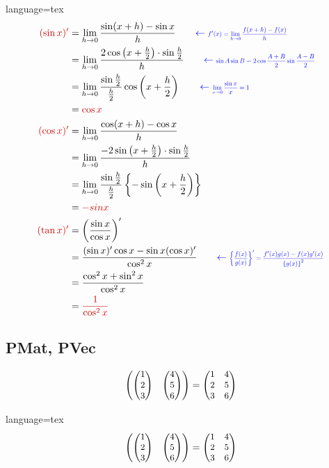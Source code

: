 \documentclass[../main]{subfiles}
\begin{document}
\begin{Code}{language=tex}
    \begin{align}
        \EmLight{(\sin x)'} &= \lim_{h\to 0}\frac{\sin(x+h)-\sin x}{h}
        \qquad \ExprNote{f'(x) = \lim_{h\to 0}\frac{f(x+h)-f(x)}{h}} \\
        &= \lim_{h\to 0}\frac{2\cos\left(x+\frac{h}{2}\right)\cdot\sin\frac{h}{2}}{h}
        \qquad \ExprNote{\sin A\sin B = 2\cos\frac{A+B}{2}\sin\frac{A-B}{2}} \\
        &= \lim_{h\to 0}\frac{\sin\frac{h}{2}}{\frac{h}{2}}\cos\left(x+\frac{h}{2}\right)
        \qquad \ExprNote{\lim_{x\to 0}\frac{\sin x}{x} = 1} \\
        &= \EmLight{\cos x} \\
        \EmLight{(\cos x)'} &= \lim_{h\to 0}\frac{\cos(x+h)-\cos x}{h} \\
        &= \lim_{h\to 0}\frac{-2\sin\left(x+\frac{h}{2}\right)\cdot\sin\frac{h}{2}}{h} \\
        &= \lim_{h\to 0}\frac{\sin\frac{h}{2}}{\frac{h}{2}}
        \left\{-\sin\left(x+\frac{h}{2}\right)\right\} \\
        &= \EmLight{-sin x} \\
        \EmLight{(\tan x)'} &= \left(\frac{\sin x}{\cos x}\right)' \\
        &= \frac{(\sin x)'\cos x - \sin x(\cos x)'}{\cos^2 x}
        \qquad \ExprNote{
            \left\{
                \frac{f(x)}{g(x)}
            \right\}' = \frac{f'(x)g(x)-f(x)g'(x)}
            {\left\{g(x)\right\}^2}
        } \\
        &= \frac{\cos^2 x + \sin^2 x}{\cos^2 x} \\
        &= \EmLight{\frac{1}{\cos^2 x}}
    \end{align}
\end{Code}

\subsection{PMat, PVec}

\[
    \PMat{\PVec{1\\2\\3}&\PVec{4\\5\\6}} =
    \PMat{1&4\\2&5\\3&6}
\]
\begin{Code}{language=tex}
\[
    \PMat{\PVec{1\\2\\3}&\PVec{4\\5\\6}} =
    \PMat{1&4\\2&5\\3&6}
\]
\end{Code}
\end{document}

